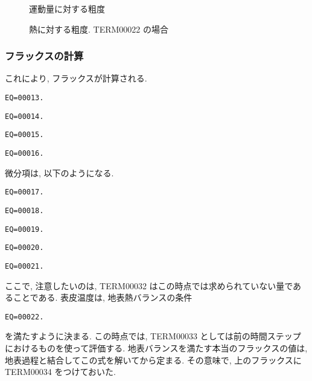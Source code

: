 \begin{figure}[htbp]
  \begin{center}
    \caption{運動量に対する粗度}
    \label{p-sflx:cm}
  \end{center}
\end{figure}
\begin{figure}[htbp]
  \begin{center}
    \caption{熱に対する粗度. TERM00022 の場合}
    \label{p-sflx:ch}
  \end{center}
\end{figure}

\subsubsection{フラックスの計算}

これにより, フラックスが計算される.
%
\begin{verbatim}
EQ=00013.
\end{verbatim}
\begin{verbatim}
EQ=00014.
\end{verbatim}
\begin{verbatim}
EQ=00015.
\end{verbatim}
\begin{verbatim}
EQ=00016.
\end{verbatim}

微分項は, 以下のようになる.
\begin{verbatim}
EQ=00017.
\end{verbatim}
\begin{verbatim}
EQ=00018.
\end{verbatim}
\begin{verbatim}
EQ=00019.
\end{verbatim}
\begin{verbatim}
EQ=00020.
\end{verbatim}
\begin{verbatim}
EQ=00021.
\end{verbatim}

ここで, 注意したいのは,
TERM00032 はこの時点では求められていない量であることである.
表皮温度は, 
地表熱バランスの条件
\begin{verbatim}
EQ=00022.
\end{verbatim}
を満たすように決まる.
この時点では, TERM00033 としては前の時間ステップにおけるものを使って評価する.
地表バランスを満たす本当のフラックスの値は,
地表過程と結合してこの式を解いてから定まる.
その意味で, 上のフラックスに TERM00034 をつけておいた.

